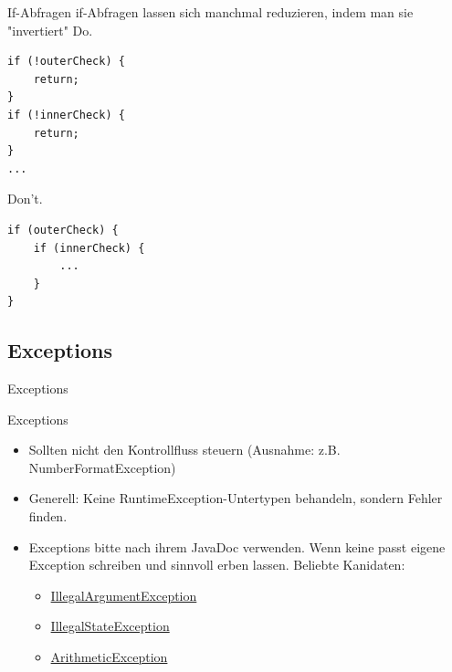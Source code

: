 \documentclass[aspectratio=169]{beamer}
\begin{document}
\begin{frame}[fragile]
  \begin{block}{If-Abfragen}
    \color{keywordcolor}if\color{FGround}-Abfragen lassen sich manchmal reduzieren, indem man sie "invertiert" \linebreak
    \pause
    \color{nicegreen}Do.\color{FGround}
    \begin{lstlisting}[numbers=none]
if (!outerCheck) { 
    return; 
} 
if (!innerCheck) { 
    return; 
} 
...
    \end{lstlisting}
    \pause
    \color{alertcolor}Don't.\color{FGround}
    \begin{lstlisting}[numbers=none]
if (outerCheck) { 
    if (innerCheck) { 
        ... 
    } 
}
    \end{lstlisting}
  \end{block}
\end{frame}

\subsection{Exceptions}
\begin{frame}{Exceptions}
  \begin{block}{Exceptions}
    \begin{itemize}
      \pause
      \item Sollten nicht den Kontrollfluss steuern (Ausnahme: z.B. \color{classcolor}NumberFormatException\color{FGround})
      \pause
      \item Generell: Keine \color{classcolor}RuntimeException\color{FGround}-Untertypen behandeln, sondern Fehler finden.
      \pause
      \item Exceptions bitte nach ihrem JavaDoc verwenden. Wenn keine passt eigene Exception schreiben und sinnvoll erben lassen. \linebreak
      Beliebte Kanidaten:
      \begin{itemize}
        \pause
        \item \href{https://docs.oracle.com/en/java/javase/16/docs/api/java.base/java/lang/IllegalArgumentException.html}{IllegalArgumentException}
        \pause
        \item \href{https://docs.oracle.com/en/java/javase/16/docs/api/java.base/java/lang/IllegalStateException.html}{IllegalStateException}
        \pause
        \item \href{https://docs.oracle.com/en/java/javase/16/docs/api/java.base/java/lang/ArithmeticException.html}{ArithmeticException}
      \end{itemize}
    \end{itemize}
  \end{block}
\end{frame}
\end{document}
